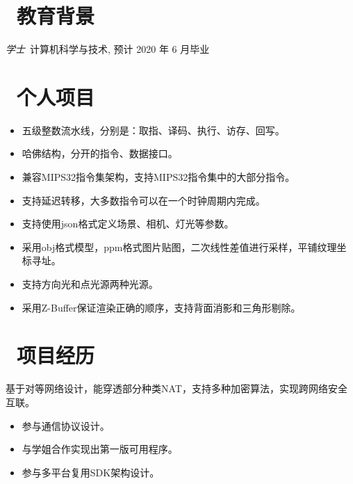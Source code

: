 \documentclass{resume}
\begin{document}


 
\section{\faGraduationCap\  教育背景}
\textit{学士}\ 计算机科学与技术, 预计 2020 年 6 月毕业

\section{\faGithubAlt\ 个人项目}
\begin{itemize}
  \item 五级整数流水线，分别是：取指、译码、执行、访存、回写。
  \item 哈佛结构，分开的指令、数据接口。
  \item 兼容MIPS32指令集架构，支持MIPS32指令集中的大部分指令。
  \item 支持延迟转移，大多数指令可以在一个时钟周期内完成。
\end{itemize}

\begin{itemize}
  \item 支持使用json格式定义场景、相机、灯光等参数。
  \item 采用obj格式模型，ppm格式图片贴图，二次线性差值进行采样，平铺纹理坐标寻址。
  \item 支持方向光和点光源两种光源。
  \item 采用Z-Buffer保证渲染正确的顺序，支持背面消影和三角形剔除。
\end{itemize}

\section{\faUsers\ 项目经历}
\role{C, Linux}{实验室项目}
基于对等网络设计，能穿透部分种类NAT，支持多种加密算法，实现跨网络安全互联。
\begin{itemize}
  \item 参与通信协议设计。
  \item 与学姐合作实现出第一版可用程序。
  \item 参与多平台复用SDK架构设计。
\end{itemize}
\end{document}
